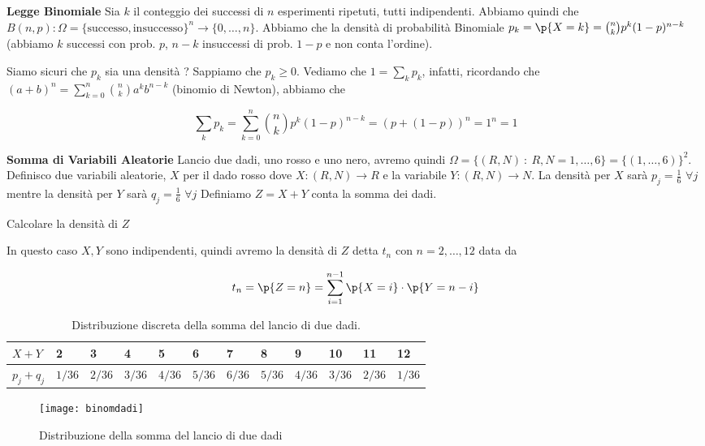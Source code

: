 \begin{defn}
    \textbf{Legge Binomiale}
    Sia $ k $ il conteggio dei successi di $ n $ esperimenti ripetuti, tutti
 indipendenti. Abbiamo quindi che $ B(n,p) :
 \Omega=\{\text{successo},\text{insuccesso}\}^n \to \{0, \dots, n\} $. Abbiamo
 che la densit\`a  di probabilit\`a  Binomiale $ p_k = \p{X=k} = \binom{n}{k}
 p^k(1-p)^{n-k} $ (abbiamo $k$ successi con prob. $p$, $n-k$ insuccessi di prob.
 $1-p$ e non conta l'ordine).
\end{defn}
Siamo sicuri che $ p_k $ sia una densit\`a ? Sappiamo che $ p_k \geq 0 $.
Vediamo che $ 1 = \sum_{k} p_k $, infatti, ricordando che  $ (a+b)^n =
\sum_{k=0}^{n} \binom{n}{k} a^k b^{n-k} $ (binomio di Newton), abbiamo che

\begin{equation*}
    \sum_{k} p_k = \sum_{k=0}^{n} \binom{n}{k} p^k (1-p)^{n-k} = (p+(1-p))^n = 1^n = 1
\end{equation*}

\begin{exmp}
    \textbf{Somma di Variabili Aleatorie}
    Lancio due dadi, uno rosso e uno nero, avremo quindi $ \Omega = \{(R, N)\ :
    \ R,N=1,\dots,6\} = \{(1,\dots,6)\}^2 $. Definisco due variabili aleatorie,
    $ X $ per il dado rosso dove $ X : (R, N) \to R $ e la variabile $ Y : (R,
    N) \to N $. La densit\`a  per $ X $ sar\`a  $ p_j = \frac{1}{6}$ $\forall j
    $ mentre la densit\`a  per $ Y $ sar\`a  $ q_j = \frac{1}{6}$ $\forall j $
    Definiamo $ Z = X + Y $ conta la somma dei dadi.



    Calcolare la densit\`a  di $ Z $

    In questo caso $ X, Y $ sono indipendenti, quindi avremo la densit\`a  di $
    Z $ detta $ t_n $ con $n=2,\dots, 12$ data da
    
    \begin{equation*}
        t_n= \p{Z = n} = \sum_{i=1}^{n-1} \p{X = i} \cdot \p{Y = n - i}
    \end{equation*}
    
    \begin{table}[H]
        \centering
        \caption{Distribuzione discreta della somma del lancio di due dadi.}
        \label{tab:distribdice1}
        \begin{tabular}{|l|l|l|l|l|l|l|l|l|l|l|l|}
            \hline
            $ X + Y $     & 2        & 3        & 4        & 5        & 6
            & 7        & 8        & 9        & 10       & 11       & 12       \\
            \hline
            $ p_j + q_j $ & $ 1/36 $ & $ 2/36 $ & $ 3/36 $ & $ 4/36 $ & $ 5/36 $
            & $ 6/36 $ & $ 5/36 $ & $ 4/36 $ & $ 3/36 $ & $ 2/36 $ & $ 1/36 $ \\
            \hline
        \end{tabular}
    \end{table}
    
    \begin{figure}[H]
        \centering
        \caption{Distribuzione della somma del lancio di due dadi}
        \texttt{[image: binomdadi]}
    \end{figure}
\end{exmp}

